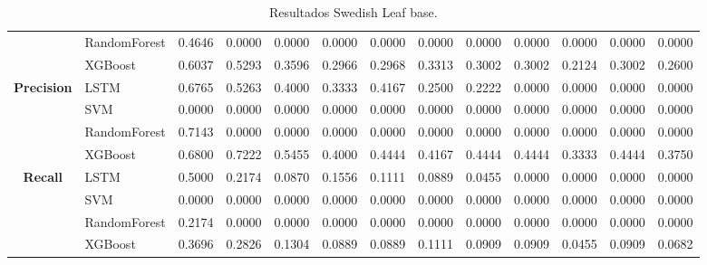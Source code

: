 \begin{table}[h]
\begin{adjustbox}{max width=15cm}
\begin{tabular}{|c|l|r|r|r|r|r|r|r|r|r|r|r|}
		& RandomForest &  0.4646 &  0.0000 &  0.0000 &  0.0000 &  0.0000 &  0.0000 &  0.0000 &  0.0000 &  0.0000 &  0.0000 &  0.0000 \\
		& XGBoost &  0.6037 &  0.5293 &  0.3596 &  0.2966 &  0.2968 &  0.3313 &  0.3002 &  0.3002 &  0.2124 &  0.3002 &  0.2600 \\
		\hline
		\textbf{Precision} & LSTM &  0.6765 &  0.5263 &  0.4000 &  0.3333 &  0.4167 &  0.2500 &  0.2222 &  0.0000 &  0.0000 &  0.0000 &  0.0000 \\
		& SVM &  0.0000 &  0.0000 &  0.0000 &  0.0000 &  0.0000 &  0.0000 &  0.0000 &  0.0000 &  0.0000 &  0.0000 &  0.0000 \\
		& RandomForest &  0.7143 &  0.0000 &  0.0000 &  0.0000 &  0.0000 &  0.0000 &  0.0000 &  0.0000 &  0.0000 &  0.0000 &  0.0000 \\
		& XGBoost &  0.6800 &  0.7222 &  0.5455 &  0.4000 &  0.4444 &  0.4167 &  0.4444 &  0.4444 &  0.3333 &  0.4444 &  0.3750 \\
		\hline
		\textbf{Recall} & LSTM &  0.5000 &  0.2174 &  0.0870 &  0.1556 &  0.1111 &  0.0889 &  0.0455 &  0.0000 &  0.0000 &  0.0000 &  0.0000 \\
		& SVM &  0.0000 &  0.0000 &  0.0000 &  0.0000 &  0.0000 &  0.0000 &  0.0000 &  0.0000 &  0.0000 &  0.0000 &  0.0000 \\
		& RandomForest &  0.2174 &  0.0000 &  0.0000 &  0.0000 &  0.0000 &  0.0000 &  0.0000 &  0.0000 &  0.0000 &  0.0000 &  0.0000 \\
		& XGBoost &  0.3696 &  0.2826 &  0.1304 &  0.0889 &  0.0889 &  0.1111 &  0.0909 &  0.0909 &  0.0455 &  0.0909 &  0.0682 \\
		\hline
	\end{tabular}
\end{adjustbox}
\caption{Resultados Swedish Leaf base.}
\label{tab:SLeaf_base}
\end{table}
\newpage
